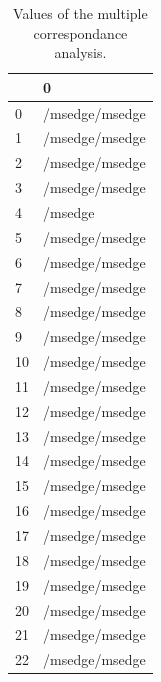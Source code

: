 \documentclass[a4paper,twoside,12pt]{book}
\begin{document}
\begin{appendices}
\begin{table}
	\centering
	\caption{Values of the multiple correspondance analysis.}
	\label{id:tab:fullPaths}
	\begin{tabular}{ll}
		\toprule
		{} &                                                  0 \\
		\midrule
		0   &                                     /msedge/msedge \\
		1   &                                     /msedge/msedge \\
		2   &                                     /msedge/msedge \\
		3   &                                     /msedge/msedge \\
		4   &                                            /msedge \\
		5   &                                     /msedge/msedge \\
		6   &                                     /msedge/msedge \\
		7   &                                     /msedge/msedge \\
		8   &                                     /msedge/msedge \\
		9   &                                     /msedge/msedge \\
		10  &                                     /msedge/msedge \\
		11  &                                     /msedge/msedge \\
		12  &                                     /msedge/msedge \\
		13  &                                     /msedge/msedge \\
		14  &                                     /msedge/msedge \\
		15  &                                     /msedge/msedge \\
		16  &                                     /msedge/msedge \\
		17  &                                     /msedge/msedge \\
		18  &                                     /msedge/msedge \\
		19  &                                     /msedge/msedge \\
		20  &                                     /msedge/msedge \\
		21  &                                     /msedge/msedge \\
		22  &                                     /msedge/msedge \\

\end{tabular}
\end{table}
\end{appendices}
\end{document}
